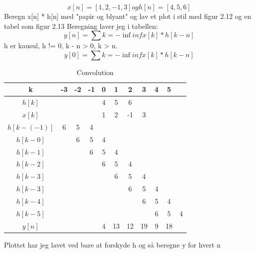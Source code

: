 
\begin{Opgaver}
    \begin{kapitel}[Introduktion]
    \end{kapitel}
    \begin{kapitel}
        \begin{Opgave}
            \[x[n] = [1, 2, -1, 3] og h[n]= [4, 5, 6]\]
            Beregn x[n] * h[n] med "papir og blyant" og lav et plot i stil med figur 2.12 og en tabel som figur 2.13
            Beregning laver jeg i tabellen: 
            \[y[n] = \sum{k = -\inf}{inf} x[k] * h[k - n]\]
            h er kausul, h != 0, k - n > 0, k > n. 
            \[y[0] = \sum{k = -\inf}{inf} x[k] * h[k - n]\]
            \begin{table}[h]
                \centering
                \begin{tabular}{c|c c c c c c c c c c}  %
                    \hline
                    k               & -3 & -2 & -1 & 0 &  1 &  2 &  3 & 4 &  5 &   \\
                    \hline
                    $h[k]$          &    &    &    & 4 &  5 &  6 &    &   &    &   \\
                    $x[k]$          &    &    &    & 1 &  2 & -1 &  3 &   &    &   \\
                    \hline
                    $h[k - (-1)]$   &  6 &  5 &  4 &   &    &    &    &   &    &   \\
                    $h[k - 0]$      &    &  6 &  5 & 4 &    &    &    &   &    &   \\ 
                    $h[k - 1]$      &    &    &  6 & 5 &  4 &    &    &   &    &   \\
                    $h[k - 2]$      &    &    &    & 6 &  5 &  4 &    &   &    &   \\
                    $h[k - 3]$      &    &    &    &   &  6 &  5 &  4 &   &    &   \\
                    $h[k - 3]$      &    &    &    &   &    &  6 &  5 & 4 &    &   \\
                    $h[k - 4]$      &    &    &    &   &    &    &  6 & 5 &  4 &   \\
                    $h[k - 5]$      &    &    &    &   &    &    &    & 6 &  5 & 4 \\
                    \hline
                    $y[n]$          &    &    &    & 4 & 13 & 12 & 19 & 9 & 18 & 
                \end{tabular}
                \caption{Convolution}
                \label{tab{1}:Convolution}
            \end{table}\clearpage
            Plottet har jeg lavet ved bare at forskyde h og så beregne y for hvert n
        \end{Opgave}\clearpage
        

\end{kapitel}
\end{Opgaver}

